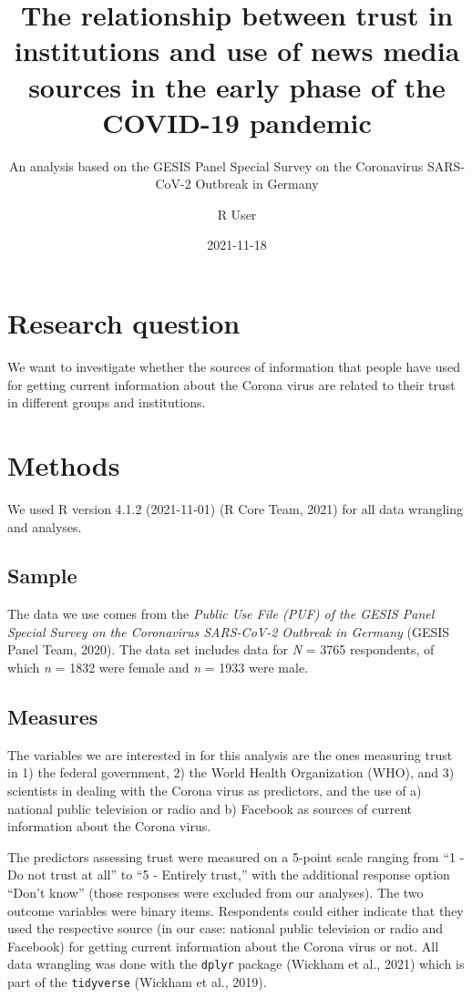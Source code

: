 \documentclass[
]{article}
\title{The relationship between trust in institutions and use of news
media sources in the early phase of the COVID-19 pandemic}
\subtitle{An analysis based on the GESIS Panel Special Survey on the
Coronavirus SARS-CoV-2 Outbreak in Germany}
\author{R User}
\date{2021-11-18}
\begin{document}
\maketitle

\hypertarget{research-question}{%
\section{Research question}\label{research-question}}

We want to investigate whether the sources of information that people
have used for getting current information about the Corona virus are
related to their trust in different groups and institutions.

\hypertarget{methods}{%
\section{Methods}\label{methods}}

We used R version 4.1.2 (2021-11-01) (R Core Team, 2021) for all data
wrangling and analyses.

\hypertarget{sample}{%
\subsection{Sample}\label{sample}}

The data we use comes from the \emph{Public Use File (PUF) of the GESIS
Panel Special Survey on the Coronavirus SARS-CoV-2 Outbreak in Germany}
(GESIS Panel Team, 2020). The data set includes data for \emph{N} = 3765
respondents, of which \emph{n} = 1832 were female and \emph{n} = 1933
were male.

\hypertarget{measures}{%
\subsection{Measures}\label{measures}}

The variables we are interested in for this analysis are the ones
measuring trust in 1) the federal government, 2) the World Health
Organization (WHO), and 3) scientists in dealing with the Corona virus
as predictors, and the use of a) national public television or radio and
b) Facebook as sources of current information about the Corona virus.

The predictors assessing trust were measured on a 5-point scale ranging
from ``1 - Do not trust at all'' to ``5 - Entirely trust,'' with the
additional response option ``Don't know'' (those responses were excluded
from our analyses). The two outcome variables were binary items.
Respondents could either indicate that they used the respective source
(in our case: national public television or radio and Facebook) for
getting current information about the Corona virus or not. All data
wrangling was done with the \texttt{dplyr} package (Wickham et al.,
2021) which is part of the \texttt{tidyverse} (Wickham et al., 2019).
\end{document}
